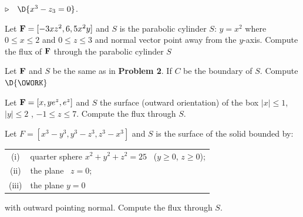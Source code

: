 \documentclass[12pt]{amsart}
\numberwithin{equation}{section}
\begin{document}
\qquad $\triangleright \quad \D{x^3-z_3=0}$.

\thispagestyle{empty}
\newpage
\thispagestyle{empty}

 Let ${\bf F} = [-3xz^2, 6, 5x^2y]$ and $S$ is the parabolic cylinder $S:\, y=x^2$ where $0 \le x \le 2$ and $0 \le z \le 3$ and normal vector point away from the $y$-axis.  Compute the flux of ${\bf F}$ through the parabolic cylinder $S$

\vspace{0.2cm}

\thispagestyle{empty}
\newpage
\thispagestyle{empty}

 Let ${\bf F}$ and $S$ be the same as in {\bf Problem 2}. If $C$ be the boundary of $S$.  Compute \quad $\D{\OWORK}$

\thispagestyle{empty}
\newpage
\thispagestyle{empty}

 Let $\text{\bf F} = [x,ye^z,e^z]$ and $S$ the surface (outward orientation) of the box $|x|\le 1$, $|y|\le 2$ , $-1\le z \le 7$. Compute the flux through $S$.

\vspace{0.2cm}

\thispagestyle{empty}
\newpage
\thispagestyle{empty}

 Let $F = [x^3-y^3,y^3-z^3,z^3-x^3]$ and $S$ is the surface of the solid bounded by: 

\vspace{0.2cm}

\setlength{\extrarowheight}{0.2cm}
\begin{tabular}{cl}
	(i) & quarter sphere $x^2 + y^2 + z^2 = 25$ \, ($y\ge0$, $z\ge 0$); \\

	(ii) & the plane \, $z = 0$; \\

	(iii) & the plane $y=0$ \\
\end{tabular}

\vspace{0.4cm}

\noindent with outward pointing normal. Compute the flux through $S$.

\thispagestyle{empty}
\newpage
\thispagestyle{empty}

%
%
\end{document}
